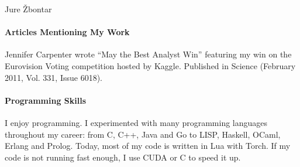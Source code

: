 \documentclass[12pt,a4paper]{article}
\begin{document}
\begin{cv}{Jure \v{Z}bontar}
\paragraph*{Articles Mentioning My Work}
Jennifer Carpenter wrote ``May the Best Analyst Win'' featuring my win on the
Eurovision Voting competition hosted by Kaggle. Published in Science (February
2011, Vol.  331, Issue 6018).

\paragraph*{Programming Skills}
I enjoy programming. I experimented with many programming languages
throughout my career: from C, C++, Java and Go to LISP, Haskell, OCaml, Erlang
and Prolog. Today, most of my code is written in Lua with Torch. If my code is
not running fast enough, I use CUDA or C to speed it up.

\end{cv}
\end{document}
